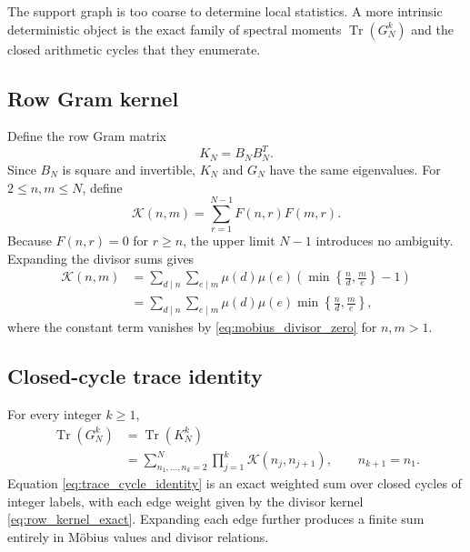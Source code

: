 \documentclass[11pt]{amsart}
\numberwithin{equation}{section}
\theoremstyle{plain}
\theoremstyle{definition}
\theoremstyle{remark}
\newcommand{\mob}{\mu}
\newcommand{\Tr}{\operatorname{Tr}}
\begin{document}
The support graph is too coarse to determine local statistics.  A more intrinsic deterministic object is the exact family of spectral moments $\Tr(G_N^k)$ and the closed arithmetic cycles that they enumerate.

\subsection{Row Gram kernel}
\label{subsec:row_gram_kernel}

Define the row Gram matrix
\begin{equation}
K_N=B_NB_N^T.
\label{eq:row_gram}
\end{equation}
Since $B_N$ is square and invertible, $K_N$ and $G_N$ have the same eigenvalues.  For $2\le n,m\le N$, define
\begin{equation}
\mathcal K(n,m)=\sum_{r=1}^{N-1}F(n,r)F(m,r).
\label{eq:row_kernel_definition}
\end{equation}
Because $F(n,r)=0$ for $r\ge n$, the upper limit $N-1$ introduces no ambiguity.  Expanding the divisor sums gives
\begin{align}
\mathcal K(n,m)
&=
\sum_{d\mid n}\sum_{e\mid m}
\mob(d)\mob(e)
\left(\min\left\{\frac nd,\frac me\right\}-1\right)
\label{eq:row_kernel_with_constant}\\
&=
\sum_{d\mid n}\sum_{e\mid m}
\mob(d)\mob(e)
\min\left\{\frac nd,\frac me\right\},
\label{eq:row_kernel_exact}
\end{align}
where the constant term vanishes by \eqref{eq:mobius_divisor_zero} for $n,m>1$.

\subsection{Closed-cycle trace identity}
\label{subsec:closed_cycle_trace}

For every integer $k\ge1$,
\begin{align}
\Tr(G_N^k)
&=\Tr(K_N^k)
\label{eq:trace_gram_equality}\\
&=
\sum_{n_1,\ldots,n_k=2}^{N}
\prod_{j=1}^{k}
\mathcal K(n_j,n_{j+1}),
\qquad n_{k+1}=n_1.
\label{eq:trace_cycle_identity}
\end{align}
Equation \eqref{eq:trace_cycle_identity} is an exact weighted sum over closed cycles of integer labels, with each edge weight given by the divisor kernel \eqref{eq:row_kernel_exact}.  Expanding each edge further produces a finite sum entirely in M\"obius values and divisor relations.
\end{document}
